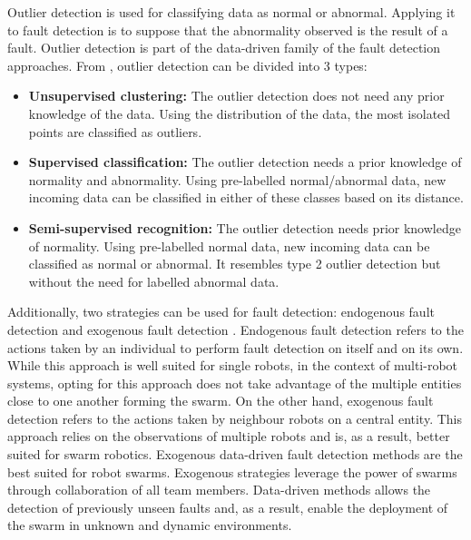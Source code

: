 Outlier detection is used for classifying data as normal or abnormal. Applying it to fault detection is to suppose that the abnormality observed is the result of a fault. Outlier detection is part of the data-driven family of the fault detection approaches. From \cite{hodge2004survey}, outlier detection can be divided into 3 types: 

\begin{itemize}
    \item \textbf{Unsupervised clustering:} The outlier detection does not need any prior knowledge of the data. Using the distribution of the data, the most isolated points are classified as outliers.
    \item \textbf{Supervised classification:} The outlier detection needs a prior knowledge of normality and abnormality. Using pre-labelled normal/abnormal data, new incoming data can be classified in either of these classes based on its distance. 
    \item \textbf{Semi-supervised recognition:} The outlier detection needs prior knowledge of normality. Using pre-labelled normal data, new incoming data can be classified as normal or abnormal. It resembles type 2 outlier detection but without the need for labelled abnormal data.
\end{itemize}


Additionally, two strategies can be used for fault detection: endogenous fault detection and exogenous fault detection \cite{christensen2008fault, lau2012error, Miller2021modern}. Endogenous fault detection refers to the actions taken by an individual to perform fault detection on itself and on its own. While this approach is well suited for single robots, in the context of multi-robot systems, opting for this approach does not take advantage of the multiple entities close to one another forming the swarm. On the other hand, exogenous fault detection refers to the actions taken by neighbour robots on a central entity. This approach relies on the observations of multiple robots and is, as a result, better suited for swarm robotics. Exogenous data-driven fault detection methods are the best suited for robot swarms. Exogenous strategies leverage the power of swarms through collaboration of all team members. Data-driven methods allows the detection of previously unseen faults and, as a result, enable the deployment of the swarm in unknown and dynamic environments.


